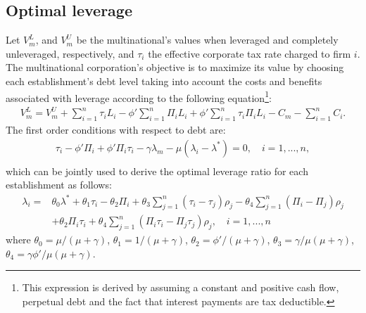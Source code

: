 \documentclass[12pt]{article}
\begin{document}
	\subsection{Optimal leverage}
	\label{subsec:opt_leverage}
	Let $V_m^L$, and $V_m^U$ be the multinational's values when leveraged and completely unleveraged, respectively, and $\tau_{i}$ the effective corporate tax rate charged to firm $i$. The multinational corporation's objective is to maximize its value by choosing each establishment's debt level taking into account the costs and benefits associated with leverage according to the following equation\footnote{This expression is derived by assuming a constant and positive cash flow, perpetual debt and the fact that interest payments are tax deductible.}:
	\begin{equation}
	\begin{aligned}
	V_m^L=V_m^U+\sum_{i=1}^{n}\tau_iL_i-\phi'\sum_{i=1}^{n}\Pi_iL_i+\phi'\sum_{i=1}^{n}\tau_i\Pi_i L_i-C_m-\sum_{i=1}^{n}C_i.
	\end{aligned}
	\label{eq:v_l}
	\end{equation}
    The first order conditions with respect to debt are:
	\begin{equation}
	\begin{aligned}
	\tau_i-\phi'\Pi_i+\phi'\Pi_i\tau_{i}-\gamma\lambda_m-\mu(\lambda_i-\lambda^*)=0, \quad i=1,...,n,\\
	\end{aligned}
	\label{eq:FOC}
	\end{equation}
	which can be jointly used to derive the optimal leverage ratio for each establishment as follows:
	\begin{equation}
	\begin{aligned}
	\lambda_i=&\theta_0\lambda^*+\theta_1\tau_i-\theta_2\Pi_i+\theta_3\sum_{j=1}^{n}(\tau_i-\tau_j)\rho_j-\theta_4\sum_{j=1}^{n}(\Pi_i-\Pi_j)\rho_j\\
	&+\theta_2\Pi_i\tau_{i}+\theta_4\sum_{j=1}^{n}(\Pi_i\tau_i-\Pi_j\tau_j)\rho_j, \quad i=1,...,n
	\end{aligned}
	\label{eq:optimal leverage in theory}
	\end{equation}
	where $ \theta_0=\mu/(\mu+\gamma)$, $\theta_1=1/(\mu+\gamma)$,
	$\theta_2=\phi'/(\mu+\gamma)$,
	$\theta_3=\gamma/\mu(\mu+\gamma)$,
	$\theta_4=\gamma\phi'/\mu(\mu+\gamma)$.
	
\end{document}
